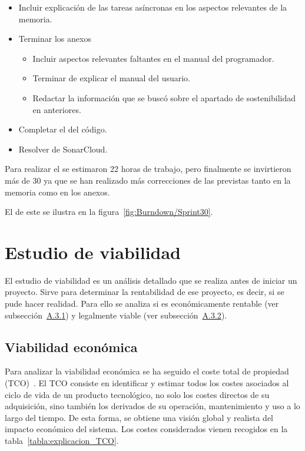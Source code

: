 \begin{itemize}
	\item Incluir explicación de las tareas asíncronas en los aspectos relevantes de la memoria.
	\item Terminar los anexos
	\begin{itemize}
		\item Incluir aspectos relevantes faltantes en el manual del programador.
		\item Terminar de explicar el manual del usuario.
		\item Redactar la información que se buscó sobre el apartado de sostenibilidad en  anteriores.
	\end{itemize}
	\item Completar el  del código.
	\item Resolver  de SonarCloud.
\end{itemize}

Para realizar el  se estimaron 22 horas de trabajo, pero finalmente se invirtieron más de 30 ya que se han realizado más correcciones de las previstas tanto en la memoria como en los anexos.

El  de este  se ilustra en la figura~\ref{fig:Burndown/Sprint30}.

\section{Estudio de viabilidad} \label{plan:viab}
El estudio de viabilidad es un análisis detallado que se realiza antes de iniciar un proyecto. Sirve para determinar la rentabilidad de ese proyecto, es decir, si se pude hacer realidad. Para ello se analiza si es económicamente rentable (ver subsección~\hyperref[viabilidad_economica]{A.3.1}) y legalmente viable (ver subsección~\hyperref[viabilidad_legal]{A.3.2}). 

\subsection{Viabilidad económica}\label{viabilidad_economica}
Para analizar la viabilidad económica se ha seguido el coste total de propiedad (TCO)~\cite{book:TCO_costs}. El TCO consiste en identificar y estimar todos los costes asociados al ciclo de vida de un producto tecnológico, no solo los costes directos de su adquisición, sino también los derivados de su operación, mantenimiento y uso a lo largo del tiempo. De esta forma, se obtiene una visión global y realista del impacto económico del sistema. Los costes considerados vienen recogidos en la tabla~\ref{tabla:explicacion_TCO}.


